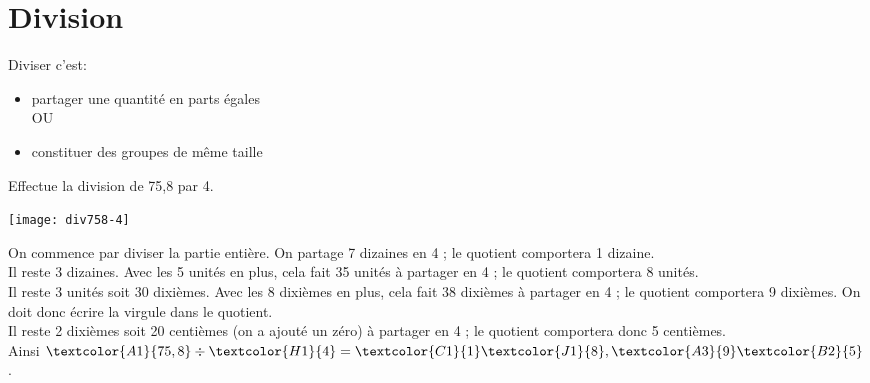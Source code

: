\section{Division}
\begin{remarque}

Diviser c'est:
\begin{itemize}
\item partager une quantité en parts égales\\
OU
\item constituer des groupes de même taille
\end{itemize}
\end{remarque}
\begin{methode*1}

\begin{exemple*1}
Effectue la division de 75,8 par 4.\\[0.5em]

\begin{minipage}[c]{.26\textwidth}
\vspace{0em}
\begin{center}\texttt{[image: div758-4]} \end{center}

\end{minipage}\hfill%
\begin{minipage}[c]{.66\textwidth}

On commence par diviser la partie entière. On partage \textcolor{A1}{7} dizaines en \textcolor{H1}{4} ; le quotient comportera \textcolor{C1}{1} dizaine.\\[0.75em]
Il reste 3 dizaines. Avec les \textcolor{A1}{5} unités en plus, cela fait 35 unités à partager en \textcolor{H1}{4} ; le quotient comportera \textcolor{J1}{8} unités. \\[0.75em]
Il reste 3 unités soit 30 dixièmes. Avec les \textcolor{A1}{8} dixièmes en plus, cela fait 38 dixièmes à partager en \textcolor{H1}{4} ; le quotient comportera \textcolor{A3}{9} dixièmes. On doit donc écrire la virgule dans le quotient.\\[0.75em]
Il reste 2 dixièmes soit 20 centièmes (on a ajouté un zéro) à partager en \textcolor{H1}{4} ; le quotient comportera donc \textcolor{B2}{5} centièmes.\\[0.75em]
Ainsi $\textcolor{A1}{75,8} \div \textcolor{H1}{4} = \textcolor{C1}{1}\textcolor{J1}{8},\textcolor{A3}{9}\textcolor{B2}{5}$.
\end{minipage}


\end{exemple*1}
\end{methode*1}
